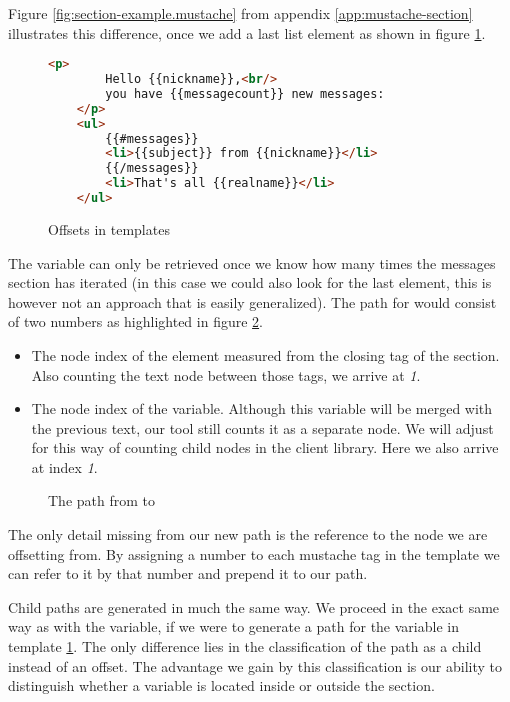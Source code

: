 \documentclass[thesis.tex]{subfiles}
\begin{document}
Figure \ref{fig:section-example.mustache} from
appendix \ref{app:mustache-section} illustrates this difference,
once we add a last list element as shown in figure \ref{fig:offsets.mustache}.
\begin{figure}
	\centering
	\begin{lstlisting}[language=HTML]
	<p>
		Hello {{nickname}},<br/>
		you have {{messagecount}} new messages:
	</p>
	<ul>
		{{#messages}}
		<li>{{subject}} from {{nickname}}</li>
		{{/messages}}
		<li>That's all {{realname}}</li>
	</ul>
	\end{lstlisting}
	\caption{Offsets in templates}
	\label{fig:offsets.mustache}
\end{figure}
The  variable can only be retrieved once we know how
many times the messages section has iterated (in this case we could also look
for the last  element, this is however not an approach that is
easily generalized). The path for  would consist of
two numbers as highlighted in figure \ref{fig:messages.ast}.
\begin{itemize}
\item The node index of the  element measured from
      the closing tag of the  section.
      Also counting the text node between those tags, we arrive at \emph{1}.
\item The node index of the  variable. Although this
      variable will be merged with the previous text, our tool still counts it
      as a separate node. We will adjust for this way of counting child nodes in
      the client library. Here we also arrive at index \emph{1}.
\end{itemize}

\begin{figure}
	\centering
	\resizebox{\linewidth}{!}{}
	\caption{The path from  to }
	\label{fig:messages.ast}
\end{figure}

The only detail missing from our new path is the reference to the node we are
offsetting from. By assigning a number to each mustache tag in the template we
can refer to it by that number and prepend it to our path.

Child paths are generated in much the same way. We proceed in the exact same way
as with the  variable, if we were to generate a path
for the  variable in template \ref{fig:offsets.mustache}.
The only difference lies in the classification of the path as a child instead of
an offset.
The advantage we gain by this classification is our ability to distinguish
whether a variable is located inside or outside the section.
\end{document}
